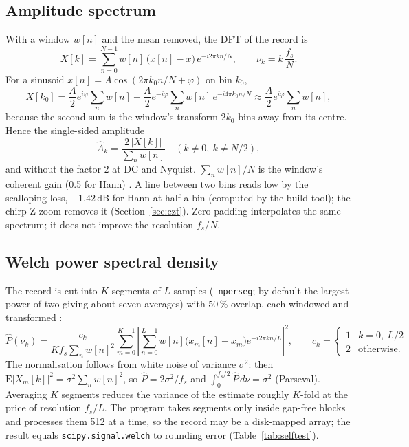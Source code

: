 \documentclass[10pt,letterpaper]{article}
\numberwithin{equation}{section}
\begin{document}
\subsection{Amplitude spectrum}\label{sec:fft}
With a window $w[n]$ and the mean removed, the DFT of the record is
\begin{equation}
X[k] = \sum_{n=0}^{N-1} w[n]\,\big(x[n]-\bar{x}\big)\,e^{-i2\pi kn/N},
\qquad \nu_k = k\,\frac{f_s}{N}.
\end{equation}
For a sinusoid $x[n] = A\cos(2\pi k_0 n/N + \varphi)$ on bin $k_0$,
\begin{equation}
X[k_0] = \frac{A}{2}e^{i\varphi}\sum_n w[n] + \frac{A}{2}e^{-i\varphi}\sum_n w[n]\,e^{-i4\pi k_0 n/N}
\approx \frac{A}{2}e^{i\varphi}\sum_n w[n],
\end{equation}
because the second sum is the window's transform $2k_0$ bins away from its
centre. Hence the single-sided amplitude
\begin{equation}
\hat{A}_k = \frac{2\,|X[k]|}{\sum_n w[n]}\quad(k \ne 0,\ k\ne N/2),
\label{eq:amplitude}
\end{equation}
and without the factor 2 at DC and Nyquist. $\sum_n w[n]/N$ is the window's
coherent gain (0.5 for Hann) \cite{R16}. A line between two bins reads low by
the scalloping loss, $-1.42$\,dB for Hann at half a bin (computed by
the build tool); the chirp-Z zoom removes it (Section~\ref{sec:czt}). Zero
padding interpolates the same spectrum; it does not improve the resolution
$f_s/N$.

\subsection{Welch power spectral density}\label{sec:welch}
The record is cut into $K$ segments of $L$ samples (\texttt{--nperseg}; by
default the largest power of two giving about seven averages) with 50\,\%
overlap, each windowed and transformed \cite{R11}:
\begin{equation}
\hat{P}(\nu_k) = \frac{c_k}{K f_s \sum_n w[n]^2}\sum_{m=0}^{K-1}
\left|\sum_{n=0}^{L-1} w[n]\big(x_m[n]-\bar{x}_m\big)e^{-i2\pi kn/L}\right|^2,
\qquad c_k = \begin{cases}1 & k = 0,\ L/2\\ 2 & \text{otherwise.}\end{cases}
\label{eq:welch}
\end{equation}
The normalisation follows from white noise of variance $\sigma^2$: then
$\mathrm{E}|X_m[k]|^2 = \sigma^2\sum_n w[n]^2$, so
$\hat{P} = 2\sigma^2/f_s$ and $\int_0^{f_s/2}\hat{P}\,d\nu = \sigma^2$
(Parseval). Averaging $K$ segments reduces the variance of the estimate roughly
$K$-fold at the price of resolution $f_s/L$. The program takes segments only
inside gap-free blocks and processes them 512 at a time, so the record may be a
disk-mapped array; the result equals \texttt{scipy.signal.welch} to rounding
error (Table~\ref{tab:selftest}).
\end{document}
